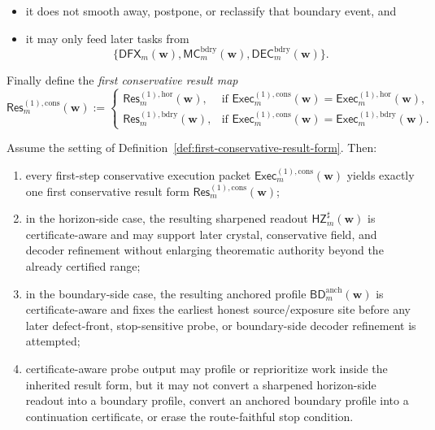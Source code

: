 \begin{definition}
\begin{enumerate}[label=(\roman*)]
\begin{itemize}[leftmargin=2em]
    \item it does not smooth away, postpone, or reclassify that boundary event, and
    \item it may only feed later tasks from
    \[
      \{\mathsf{DFX}_{m}(\mathbf w),\mathsf{MC}^{\mathrm{bdry}}_{m}(\mathbf w),\mathsf{DEC}^{\mathrm{bdry}}_{m}(\mathbf w)\}.
    \]
  \end{itemize}
\end{enumerate}
Finally define the \emph{first conservative result map}
\[
  \mathsf{Res}^{(1),\mathrm{cons}}_{m}(\mathbf w)
  :=
  \begin{cases}
    \mathsf{Res}^{(1),\mathrm{hor}}_{m}(\mathbf w), & \text{if }\mathsf{Exec}^{(1),\mathrm{cons}}_{m}(\mathbf w)=\mathsf{Exec}^{(1),\mathrm{hor}}_{m}(\mathbf w),\\[2mm]
    \mathsf{Res}^{(1),\mathrm{bdry}}_{m}(\mathbf w), & \text{if }\mathsf{Exec}^{(1),\mathrm{cons}}_{m}(\mathbf w)=\mathsf{Exec}^{(1),\mathrm{bdry}}_{m}(\mathbf w).
  \end{cases}
\]
\end{definition}

\begin{proposition}
\label{prop:every-first-step-execution-packet-yields-exactly-one-first-conservative-result-form}
Assume the setting of Definition~\ref{def:first-conservative-result-form}. Then:
\begin{enumerate}[label=(\roman*)]
  \item every first-step conservative execution packet \(\mathsf{Exec}^{(1),\mathrm{cons}}_{m}(\mathbf w)\) yields exactly one first conservative result form \(\mathsf{Res}^{(1),\mathrm{cons}}_{m}(\mathbf w)\);
  \item in the horizon-side case, the resulting sharpened readout \(\mathsf{HZ}^{\sharp}_{m}(\mathbf w)\) is certificate-aware and may support later crystal, conservative field, and decoder refinement without enlarging theorematic authority beyond the already certified range;
  \item in the boundary-side case, the resulting anchored profile \(\mathsf{BD}^{\mathrm{anch}}_{m}(\mathbf w)\) is certificate-aware and fixes the earliest honest source/exposure site before any later defect-front, stop-sensitive probe, or boundary-side decoder refinement is attempted;
  \item certificate-aware probe output may profile or reprioritize work inside the inherited result form, but it may not convert a sharpened horizon-side readout into a boundary profile, convert an anchored boundary profile into a continuation certificate, or erase the route-faithful stop condition.
\end{enumerate}
\end{proposition}

